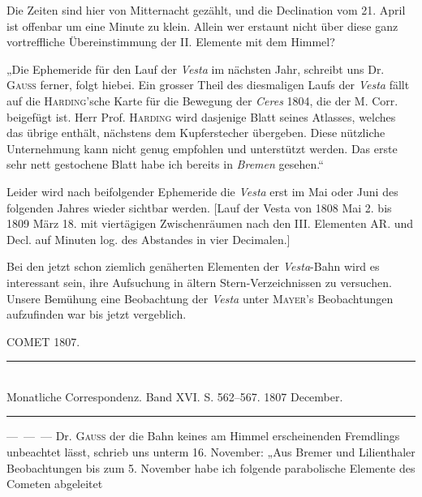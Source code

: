 \par\indent Die Zeiten sind hier von Mitternacht gezählt, und die Declination vom 21. April ist offenbar um
eine Minute zu klein. Allein wer erstaunt nicht über diese ganz vortreffliche Übereinstimmung der II.
Elemente mit dem Himmel?

\par\indent „Die Ephemeride für den Lauf der \emph{Vesta} im nächsten Jahr, schreibt uns Dr. \textsc{Gauss} ferner, folgt
hiebei. Ein grosser Theil des diesmaligen Laufs der \emph{Vesta} fällt auf die \textsc{Harding}'sche Karte für die Bewegung der \emph{Ceres} 1804, die der M. Corr. beigefügt ist. Herr Prof. \textsc{Harding} wird dasjenige Blatt seines
Atlasses, welches das übrige enthält, nächstens dem Kupferstecher übergeben. Diese nützliche Unternehmung kann nicht genug empfohlen und unterstützt werden. Das erste sehr nett gestochene Blatt
habe ich bereits in \emph{Bremen} gesehen.“

\par\indent Leider wird nach beifolgender Ephemeride die \emph{Vesta} erst im Mai oder Juni des folgenden Jahres
wieder sichtbar werden. [Lauf der Vesta von 1808 Mai 2. bis 1809 März 18. mit viertägigen Zwischenräumen nach den III. Elementen AR. und Decl. auf Minuten log. des Abstandes in vier Decimalen.]

\par\indent Bei den jetzt schon ziemlich genäherten Elementen der \emph{Vesta}-Bahn wird es interessant sein, ihre
Aufsuchung in ältern Stern-Verzeichnissen zu versuchen. Unsere Bemühung eine Beobachtung der \emph{Vesta}
unter \textsc{Mayer}'s Beobachtungen aufzufinden war bis jetzt vergeblich.

\begin{flushright}
\end{flushright}

\centerline{COMET 1807.}

\begin{center}
\rule{0.5\linewidth}{0.4pt}\\[2pt]
Monatliche Correspondenz. Band XVI. S. 562–567. 1807 December.\\[2pt]
\rule{0.5\linewidth}{0.4pt}
\end{center}
\par\indent ---\ ---\ --- Dr. \textsc{Gauss} der die Bahn keines am Himmel erscheinenden Fremdlings unbeachtet lässt,
schrieb uns unterm 16. November: „Aus Bremer und Lilienthaler Beobachtungen bis zum 5. November
habe ich folgende parabolische Elemente des Cometen abgeleitet

